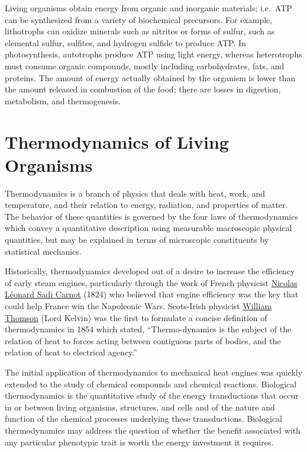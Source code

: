 Living organisms obtain energy from organic and inorganic materials; i.e.~ATP can be synthesized from a variety of biochemical precursors. For example, lithotrophs can oxidize minerals such as nitrites or forms of sulfur, such as elemental sulfur, sulfites, and hydrogen sulfide to produce ATP. In photosynthesis, autotrophs produce ATP using light energy, whereas heterotrophs must consume organic compounds, mostly including carbohydrates, fats, and proteins. The amount of energy actually obtained by the organism is lower than the amount released in combustion of the food; there are losses in digestion, metabolism, and thermogenesis.

\hypertarget{thermodynamics-of-living-organisms}{%
\section{Thermodynamics of Living Organisms}\label{thermodynamics-of-living-organisms}}

Thermodynamics is a branch of physics that deals with heat, work, and temperature, and their relation to energy, radiation, and properties of matter. The behavior of these quantities is governed by the four laws of thermodynamics which convey a quantitative description using measurable macroscopic physical quantities, but may be explained in terms of microscopic constituents by statistical mechanics.

Historically, thermodynamics developed out of a desire to increase the efficiency of early steam engines, particularly through the work of French physicist \href{https://en.wikipedia.org/wiki/Nicolas_Léonard_Sadi_Carnot}{Nicolas Léonard Sadi Carnot} (1824) who believed that engine efficiency was the key that could help France win the Napoleonic Wars. Scots-Irish physicist \href{https://en.wikipedia.org/wiki/William_Thomson,_1st_Baron_Kelvin}{William Thomson} (Lord Kelvin) was the first to formulate a concise definition of thermodynamics in 1854 which stated, ``Thermo-dynamics is the subject of the relation of heat to forces acting between contiguous parts of bodies, and the relation of heat to electrical agency.''

The initial application of thermodynamics to mechanical heat engines was quickly extended to the study of chemical compounds and chemical reactions. Biological thermodynamics is the quantitative study of the energy transductions that occur in or between living organisms, structures, and cells and of the nature and function of the chemical processes underlying these transductions. Biological thermodynamics may address the question of whether the benefit associated with any particular phenotypic trait is worth the energy investment it requires.

